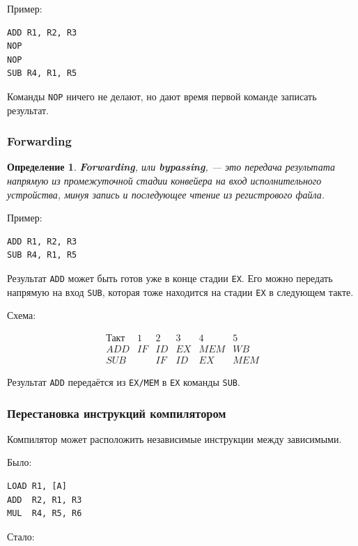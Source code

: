 \documentclass[12pt,a4paper]{article}
\newtheorem{definition}{Определение}
\begin{document}
Пример:

\begin{lstlisting}
ADD R1, R2, R3
NOP
NOP
SUB R4, R1, R5
\end{lstlisting}

Команды \texttt{NOP} ничего не делают, но дают время первой команде записать результат.

\subsubsection{Forwarding}

\begin{definition}
\textbf{Forwarding}, или \textbf{bypassing}, --- это передача результата напрямую из промежуточной стадии конвейера на вход исполнительного устройства, минуя запись и последующее чтение из регистрового файла.
\end{definition}

Пример:

\begin{lstlisting}
ADD R1, R2, R3
SUB R4, R1, R5
\end{lstlisting}

Результат \texttt{ADD} может быть готов уже в конце стадии \texttt{EX}. Его можно передать напрямую на вход \texttt{SUB}, которая тоже находится на стадии \texttt{EX} в следующем такте.

Схема:

\[
\begin{array}{c|ccccc}
\text{Такт} & 1 & 2 & 3 & 4 & 5 \\
\hline
ADD & IF & ID & EX & MEM & WB \\
SUB &    & IF & ID & EX  & MEM
\end{array}
\]

Результат \texttt{ADD} передаётся из \texttt{EX/MEM} в \texttt{EX} команды \texttt{SUB}.

\subsubsection{Перестановка инструкций компилятором}

Компилятор может расположить независимые инструкции между зависимыми.

Было:

\begin{lstlisting}
LOAD R1, [A]
ADD  R2, R1, R3
MUL  R4, R5, R6
\end{lstlisting}

Стало:
\end{document}
